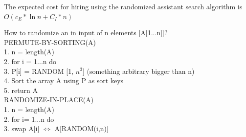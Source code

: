 \begin{lemma}
The expected cost for hiring using the randomized assistant search algorithm is \\
$O( c_E * \ln n + C_I * n)$
\end{lemma}
How to randomize an in input of n elements [A[1...n]]? \\
PERMUTE-BY-SORTING(A) \\
1.	n = length(A) \\
2.	for i = 1...n do \\
3.	P[i] = RANDOM [1, $n^3$] (something arbitrary bigger than n) \\
4.	Sort the array A using P as sort keys \\
5.	return A \\
\newline
RANDOMIZE-IN-PLACE(A) \\
1.	n = length(A) \\
2.	for i= 1...n do \\
3.	  swap A[i] $\Leftrightarrow$  A[RANDOM(i,n)] \\

